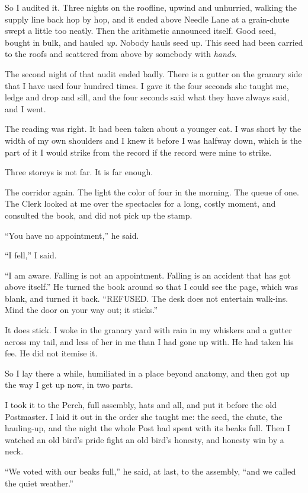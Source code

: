 So I audited it. Three nights on the roofline, upwind and unhurried, walking the supply line back hop by hop, and it ended above Needle Lane at a grain-chute swept a little too neatly. Then the arithmetic announced itself. Good seed, bought in bulk, and hauled \emph{up}. Nobody hauls seed up. This seed had been carried to the roofs and scattered from above by somebody with \emph{hands}.

The second night of that audit ended badly. There is a gutter on the granary side that I have used four hundred times. I gave it the four seconds she taught me, ledge and drop and sill, and the four seconds said what they have always said, and I went.

The reading was right. It had been taken about a younger cat. I was short by the width of my own shoulders and I knew it before I was halfway down, which is the part of it I would strike from the record if the record were mine to strike.

Three storeys is not far. It is far enough.

The corridor again. The light the color of four in the morning. The queue of one. The Clerk looked at me over the spectacles for a long, costly moment, and consulted the book, and did not pick up the stamp.

``You have no appointment,'' he said.

``I fell,'' I said.

``I am aware. Falling is not an appointment. Falling is an accident that has got above itself.'' He turned the book around so that I could see the page, which was blank, and turned it back. ``REFUSED. The desk does not entertain walk-ins. Mind the door on your way out; it sticks.''

It does stick. I woke in the granary yard with rain in my whiskers and a gutter across my tail, and less of her in me than I had gone up with. He had taken his fee. He did not itemise it.

So I lay there a while, humiliated in a place beyond anatomy, and then got up the way I get up now, in two parts.

I took it to the Perch, full assembly, hats and all, and put it before the old Postmaster. I laid it out in the order she taught me: the seed, the chute, the hauling-up, and the night the whole Post had spent with its beaks full. Then I watched an old bird's pride fight an old bird's honesty, and honesty win by a neck.

``We voted with our beaks full,'' he said, at last, to the assembly, ``and we called the quiet weather.''

